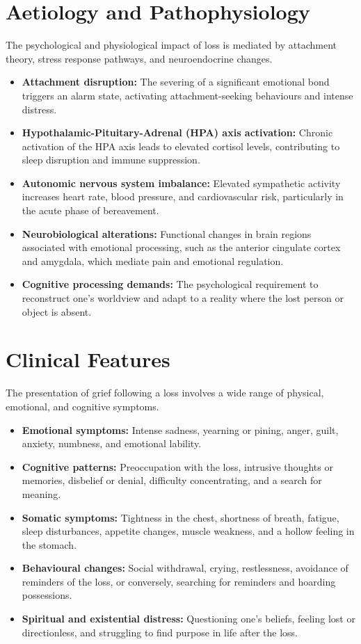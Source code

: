 \section*{Aetiology and Pathophysiology}
The psychological and physiological impact of loss is mediated by attachment theory, stress response pathways, and neuroendocrine changes.
\begin{itemize}
    \item \textbf{Attachment disruption:} The severing of a significant emotional bond triggers an alarm state, activating attachment-seeking behaviours and intense distress.
    \item \textbf{Hypothalamic-Pituitary-Adrenal (HPA) axis activation:} Chronic activation of the HPA axis leads to elevated cortisol levels, contributing to sleep disruption and immune suppression.
    \item \textbf{Autonomic nervous system imbalance:} Elevated sympathetic activity increases heart rate, blood pressure, and cardiovascular risk, particularly in the acute phase of bereavement.
    \item \textbf{Neurobiological alterations:} Functional changes in brain regions associated with emotional processing, such as the anterior cingulate cortex and amygdala, which mediate pain and emotional regulation.
    \item \textbf{Cognitive processing demands:} The psychological requirement to reconstruct one's worldview and adapt to a reality where the lost person or object is absent.
\end{itemize}

\section*{Clinical Features}
The presentation of grief following a loss involves a wide range of physical, emotional, and cognitive symptoms.
\begin{itemize}
    \item \textbf{Emotional symptoms:} Intense sadness, yearning or pining, anger, guilt, anxiety, numbness, and emotional lability.
    \item \textbf{Cognitive patterns:} Preoccupation with the loss, intrusive thoughts or memories, disbelief or denial, difficulty concentrating, and a search for meaning.
    \item \textbf{Somatic symptoms:} Tightness in the chest, shortness of breath, fatigue, sleep disturbances, appetite changes, muscle weakness, and a hollow feeling in the stomach.
    \item \textbf{Behavioural changes:} Social withdrawal, crying, restlessness, avoidance of reminders of the loss, or conversely, searching for reminders and hoarding possessions.
    \item \textbf{Spiritual and existential distress:} Questioning one's beliefs, feeling lost or directionless, and struggling to find purpose in life after the loss.
\end{itemize}

